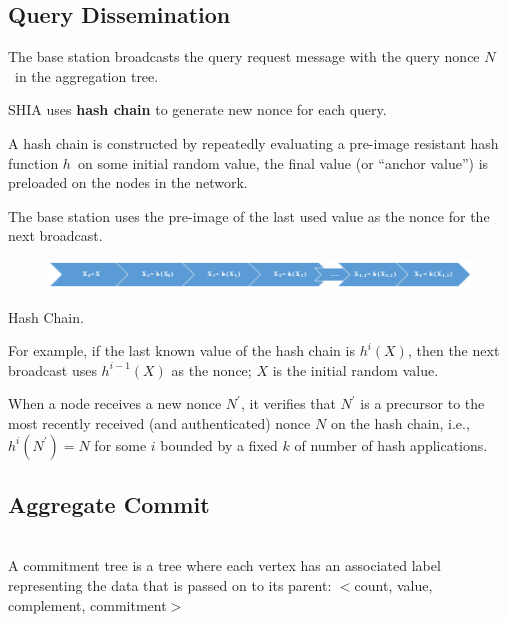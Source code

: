 \documentclass[%
  slidesonly,%
  semlayer%
  ]{seminar}                                  %
\newenvironment{defn}{\noindent \\ \noindent{\bf Defn:}}{\hspace*{\fill} \newline}
\begin{document}
\begin{slide}
    \subsection*{Query Dissemination}
      \vfill
      The base station broadcasts the query request message with the query nonce $N$\ in the aggregation tree. 
    
      SHIA uses \textbf{hash chain} to generate new nonce for each query. 
      
      A hash chain is constructed by repeatedly evaluating a pre-image resistant hash function $h$\ on some initial random value, the final value (or ``anchor value'') is preloaded on the nodes in the network.
      
      The base station uses the pre-image of the last used value as the nonce for the next broadcast.
      
      \begin{figure}[h!]
        \centering
        \includegraphics[scale=0.4]{images/hash-chain.png}
        \label{fig:hash-chain}
      \end{figure}
      \begin{center}
        Hash Chain.
      \end{center}

      For example, if the last known value of the hash chain is $h^i(X)$, then the next broadcast uses $h^{i-1}(X)$ as the nonce; $X$ is the initial random value.
      
      When a node receives a new nonce $N^{'}$, it verifies that $N^{'}$ is a precursor to the most recently received (and authenticated) nonce $N$ on the hash chain, i.e., $h^{i}(N^{'}) = N$ for some $i$ bounded by a fixed $k$ of number of hash applications.  
      \vfill
      \clearpage

    \subsection*{Aggregate Commit}
      \vfill
      \begin{defn}
        A commitment tree is a tree where each vertex has an associated label representing the data that is passed on to its parent: $<$count, value, complement, commitment$>$
      \end{defn}


\end{slide}
\end{document}
